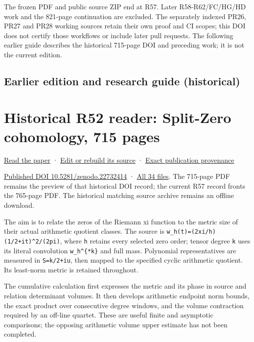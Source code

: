 \documentclass[
]{article}
\begin{document}
The frozen PDF and public source ZIP end at R57. Later R58-R62/FC/HG/HD
work and the 821-page continuation are excluded. The separately indexed
PR26, PR27 and PR28 working sources retain their own proof and CI
scopes; this DOI does not certify those workflows or include later pull
requests. The following earlier guide describes the historical 715-page
DOI and preceding work; it is not the current edition.

\subsection{Earlier edition and research guide
(historical)}\label{earlier-edition-and-research-guide-historical}

\section{Historical R52 reader: Split-Zero cohomology, 715
pages}\label{historical-r52-reader-split-zero-cohomology-715-pages}

\href{https://zenodo.org/api/records/22732414/files/33-splitzero-period-deligne-continuation-715p.pdf/content}{Read
the paper} ·
\href{workbenches/splitzero-tandem/continuations/20260913-deligne/README.md}{Edit
or rebuild its source} ·
\href{workbenches/splitzero-tandem/continuations/20260913-deligne/PUBLIC_DERIVATION.md}{Exact
publication provenance}

\href{https://doi.org/10.5281/zenodo.22732414}{Published DOI
10.5281/zenodo.22732414} ·
\href{calculation_edition_20260913_deligne/README.md}{All 34 files}. The
715-page PDF remains the preview of that historical DOI record; the
current R57 record fronts the 765-page PDF. The historical matching
source archive remains an offline download.

The aim is to relate the zeros of the Riemann xi function to the metric
size of their actual arithmetic quotient classes. The source is
\texttt{w\_h(t)=\textbar{}(2xi/h)(1/2+it)\textbar{}\^{}2/(2pi)}, where
\texttt{h} retains every selected zero order; tensor degree \texttt{k}
uses its literal convolution \texttt{w\_h\^{}\{*k\}} and full mass.
Polynomial representatives are measured in \texttt{S=k/2+iu}, then
mapped to the specified cyclic arithmetic quotient. Its least-norm
metric is retained throughout.

The cumulative calculation first expresses the metric and its phase in
source and relation determinant volumes. It then develops arithmetic
endpoint norm bounds, the exact product over consecutive degree windows,
and the volume contraction required by an off-line quartet. These are
useful finite and asymptotic comparisons; the opposing arithmetic volume
upper estimate has not been completed.
\end{document}
